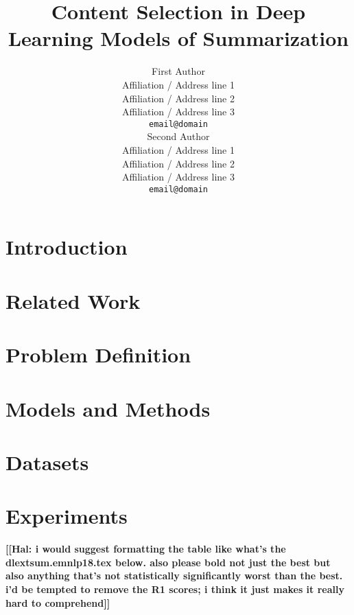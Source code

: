 \documentclass[11pt,a4paper]{article}
\title{Content Selection in Deep Learning Models of Summarization}
\author{First Author \\
  Affiliation / Address line 1 \\
  Affiliation / Address line 2 \\
  Affiliation / Address line 3 \\
  {\tt email@domain} \\\And
  Second Author \\
  Affiliation / Address line 1 \\
  Affiliation / Address line 2 \\
  Affiliation / Address line 3 \\
  {\tt email@domain} \\}
\date{}
\newcommand{\hal}[1]{\textcolor{blue!50!red!70!white}{\textbf{[[Hal: #1]]}}}
\begin{document}
\maketitle
\begin{abstract}
\end{abstract}



\section{Introduction}


\section{Related Work}


\section{Problem Definition}


\section{Models and Methods}


\section{Datasets}


\section{Experiments}


\hal{i would suggest formatting the table like what's the dlextsum.emnlp18.tex below. also please bold not just the best but also anything that's not statistically significantly worst than the best. i'd be tempted to remove the R1 scores; i think it just makes it really hard to comprehend}

\end{document}
